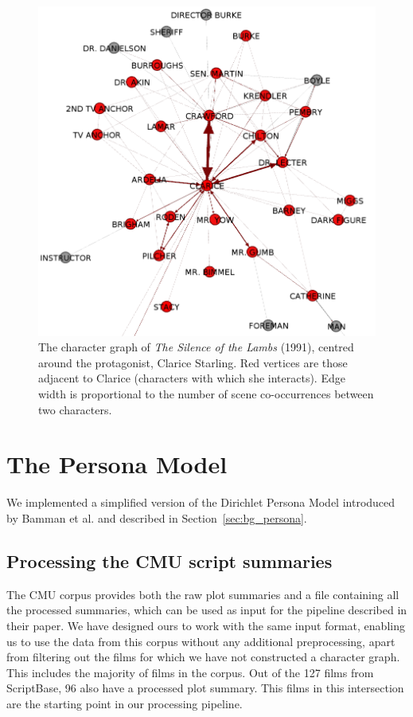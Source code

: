 \documentclass[bsc,frontabs,singlespacing,parskip, twoside]{infthesis}
\begin{document}
\begin{figure}
	\centering
	\includegraphics[scale=0.4]{figures/clarice_graph}
	\caption{The character graph of \textit{The Silence of the Lambs} (1991), centred around the protagonist, Clarice Starling. Red vertices are those adjacent to Clarice (characters with which she interacts). Edge width is proportional to the number of scene co-occurrences between two characters.}
\end{figure}

\section{The Persona Model}
\label{sec:persona_impl}
We implemented a simplified version of the Dirichlet Persona Model introduced by Bamman et al. \cite{Bamman2013} and described in Section~\ref{sec:bg_persona}. 

\subsection{Processing the CMU script summaries}
The CMU corpus provides both the raw plot summaries and a file containing all the processed summaries, which can be used as input for the pipeline described in their paper. We have designed ours to work with the same input format, enabling us to use the data from this corpus without any additional preprocessing, apart from filtering out the films for which we have not constructed a character graph. This includes the majority of films in the corpus. Out of the 127 films from ScriptBase, 96 also have a processed plot summary. This films in this intersection are the starting point in our processing pipeline.
\end{document}
